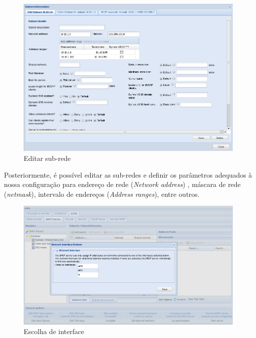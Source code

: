\begin{figure}[H]
    \begin{center}
    \includegraphics[scale=0.38]{screenshots/etfw/etfw_dhcp_subnets_02.png}
    \caption{Editar sub-rede}
    \label{fig:etfw_dhcp_subnets_02}
    \end{center}
\end{figure}

Posteriormente, é possível editar as sub-redes e definir os parâmetros adequados à nossa configuração para endereço de rede (\textit{Network address}) , máscara de rede (\textit{netmask}), intervalo de endereços (\textit{Address ranges}), entre outros.

\begin{figure}[H]
    \begin{center}
    \includegraphics[scale=0.38]{screenshots/etfw/etfw_dhcp_interfaces_01.png}
    \caption{Escolha de interface}
    \label{fig:etfw_dhcp_interfaces_01}
    \end{center}
\end{figure}

